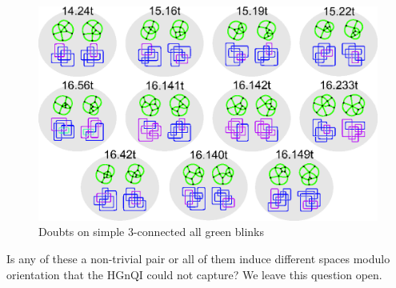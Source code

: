 \begin{figure}[htp]
   \begin{center}
      \leavevmode
      \includegraphics{A.figs/doubts3connectedisolated.eps}
   \end{center}
   \vspace{-0.7cm}
   \caption{ Doubts on simple 3-connected all green blinks}
   \label{fig:doubts3ConnectedIsolated}
\end{figure}

Is any of these a non-trivial pair or all of them induce different spaces
modulo orientation that the HGnQI could not capture? We leave this question
open.
